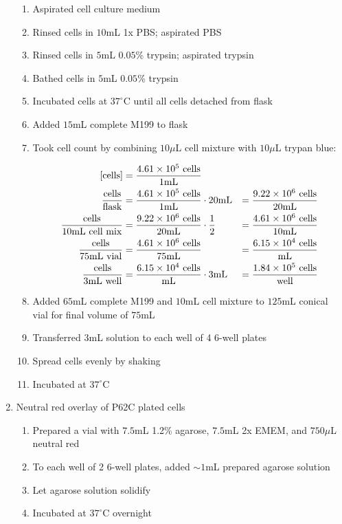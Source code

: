 \begin{enumerate}
		\begin{enumerate}
			\item Aspirated cell culture medium
			\item Rinsed cells in $10$mL 1x PBS; aspirated PBS
			\item Rinsed cells in $5$mL $0.05$\% trypsin; aspirated trypsin
			\item Bathed cells in $5$mL $0.05$\% trypsin
			\item Incubated cells at $37^{\circ}$C until all cells detached from flask
			\item Added $15$mL complete M199 to flask
			\item Took cell count by combining $10\mu$L cell mixture with $10\mu$L trypan blue:
			
				\begin{align*}
				\text{[cells]} &= \frac{4.61\times 10^{5}\text{ cells}}{1\text{mL}} \\
				\frac{\text{cells}}{\text{flask}} &= \frac{4.61\times 10^{5}\text{ cells}}{1\text{mL}} \cdot 20\text{mL} &= \frac{9.22\times 10^{6}\text{ cells}}{20\text{mL}}\\
				\frac{\text{cells}}{10\text{mL cell mix}} &= \frac{9.22\times 10^{6}\text{ cells}}{20\text{mL}}\cdot \frac{1}{2} &= \frac{4.61\times 10^{6}\text{ cells}}{10\text{mL}}\\
				\frac{\text{cells}}{75\text{mL vial}} &= \frac{4.61\times 10^{6}\text{ cells}}{75\text{mL}} &= \frac{6.15\times 10^{4}\text{ cells}}{\text{mL}}\\
				\frac{\text{cells}}{3\text{mL well}} &= \frac{6.15\times 10^{4}\text{ cells}}{\text{mL}} \cdot 3\text{mL} &= \frac{1.84\times 10^{5}\text{ cells}}{\text{well}}\\
				\end{align*}
			\item Added $65$mL complete M199 and $10$mL cell mixture to $125$mL conical vial for final volume of $75$mL
			\item Transferred $3$mL solution to each well of 4 6-well plates
			\item Spread cells evenly by shaking
			\item Incubated at $37^{\circ}$C
		\end{enumerate}
	\item Neutral red overlay of P62C plated cells
		\begin{enumerate}
			\item Prepared a vial with $7.5$mL 1.2\% agarose, $7.5$mL 2x EMEM, and $750\mu$L neutral red
			\item To each well of 2 6-well plates, added $\sim 1$mL prepared agarose solution
			\item Let agarose solution solidify
			\item Incubated at $37^{\circ}$C overnight
		\end{enumerate}
\end{enumerate}

